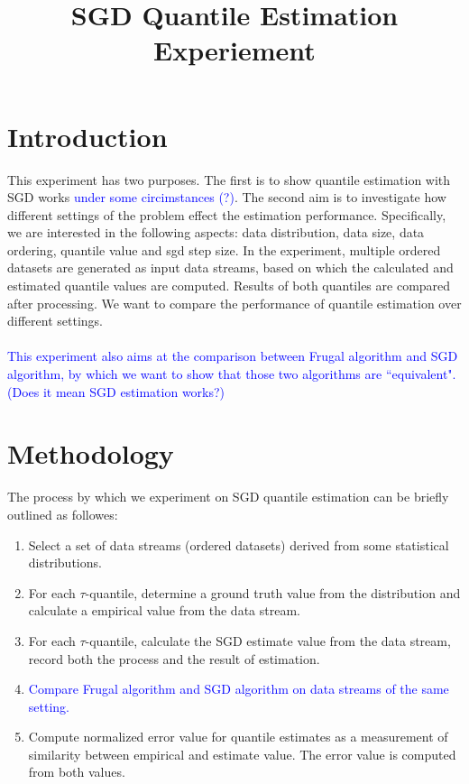 \documentclass[12pt]{article}
\title{SGD Quantile Estimation Experiement}
\date{\vspace{-5ex}}
\begin{document}
\maketitle

\section{Introduction}

This experiment has two purposes. The first is to show quantile estimation with SGD works \textcolor{blue}{ under some circimstances (?)}.
The second aim is to investigate how different settings of the problem effect the estimation performance. Specifically, we are interested in the following aspects: data distribution, data size, data ordering, quantile value and sgd step size.
In the experiment, multiple ordered datasets are generated as input data streams, based on which the calculated and estimated quantile values are computed. Results of both quantiles are compared after processing. We want to compare the performance of quantile estimation over different settings.
\\\\
\textcolor{blue}{This experiment also aims at the comparison between Frugal algorithm and SGD algorithm, by which we want to show that those two algorithms are ``equivalent". 
\\
(Does it mean SGD estimation works?)}


\section{Methodology}
The process by which we experiment on SGD quantile estimation can be briefly outlined as followes:

\begin{enumerate}
    \item Select a set of data streams (ordered datasets) derived from some statistical distributions.
    \item For each $\tau$-quantile, determine a ground truth value from the distribution and calculate a empirical value from the data stream.
    \item For each $\tau$-quantile, calculate the SGD estimate value from the data stream, record both the process and the result of estimation.
    \item \textcolor{blue}{
        Compare Frugal algorithm and SGD algorithm on data streams of the same setting.
    }
    \item Compute normalized error value for quantile estimates as a measurement of similarity between empirical and estimate value. The error value is computed from both values.
\end{enumerate}
\end{document}
